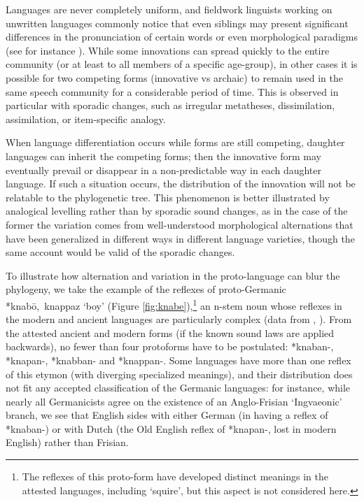 \documentclass[svgnames,12pt]{scrartcl}
\newcommand{\ipa}[1]{{{\phon\mbox{#1}}}}
\begin{document}
{{Languages are never completely uniform, and fieldwork linguists working on unwritten languages
commonly notice that even siblings may present significant differences in the pronunciation of
certain words or even morphological paradigms (see for instance \citealt[29-30]{genetti07grammar}).
While some innovations can spread quickly to the entire community (or at least to all members of a
specific age-group), in other cases it is possible for two competing forms (innovative vs archaic)
to remain used in the same  speech community for a considerable period of time. This is observed in
particular with sporadic changes, such as irregular metatheses, dissimilation, assimilation, or
item-specific analogy.

When language differentiation occurs while forms are still competing, daughter languages can inherit
the competing forms; then the innovative form may eventually prevail or disappear in a
non-predictable way in each daughter language. If such a situation occurs, the distribution of the
innovation will not be relatable to the phylogenetic tree.  This phenomenon is better illustrated by
analogical levelling rather than by sporadic sound changes, as in the case of the former the
variation comes from well-understood morphological alternations that have been generalized in
different ways in different language varieties, though the same account  would be valid of the
sporadic changes.
 
To illustrate how alternation and variation in the proto-language can blur the phylogeny, we take the example of the reflexes of proto-Germanic *\ipa{knabō, knappaz} `boy' (Figure \ref{fig:knabe}),\footnote{The reflexes of this proto-form have developed distinct meanings in the attested languages, including `squire', but this aspect is not considered here.} an n-stem noun whose reflexes in the modern and ancient languages are particularly complex (data from \citealt[71,128]{kroonen11nstems}, \citealt[294]{kroonen13dict}).
From the attested ancient and modern forms (if the known sound laws are applied backwards), no fewer than four protoforms have to be postulated:  \ipa{*knaban-}, \ipa{*knapan-}, \ipa{*knabban-} and \ipa{*knappan-}. Some languages have more than one reflex of this etymon (with diverging specialized meanings), and their distribution does not fit any accepted classification of the Germanic languages: for instance, while nearly all Germanicists agree on the existence of an Anglo-Frisian `Ingvaeonic' branch, we see that English sides with either German (in having a reflex of \ipa{*knaban-}) or with Dutch (the Old English reflex of \ipa{*knapan-}, lost in modern English) rather than Frisian.

}}
\end{document}
